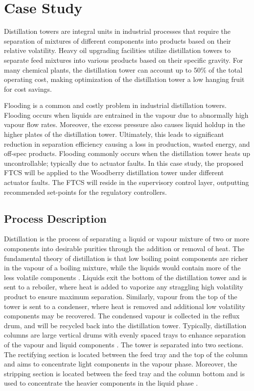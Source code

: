 \section{Case Study}
Distillation towers are integral units in industrial processes that require the separation of
mixtures of different components into products based on their relative volatility. Heavy oil
upgrading facilities utilize distillation towers to separate feed mixtures into various products based on their specific gravity.  For many chemical plants, the distillation tower can account up to 50\% of the total operating cost, making optimization of the distillation tower a low hanging fruit for cost savings.  

Flooding is a common and costly problem in industrial distillation towers.  Flooding occurs when liquids are entrained in the vapour due to abnormally high vapour flow rates.  Moreover, the excess pressure also causes liquid holdup in the higher plates of the distillation tower. Ultimately, this leads to significant reduction in separation efficiency causing a loss in production, wasted energy, and off-spec products. Flooding commonly occurs when the distillation tower heats up uncontrollable; typically due to actuator faults.  In this case study, the proposed FTCS will be applied to the Woodberry distillation tower under different actuator faults. The FTCS will reside in the supervisory control layer, outputting recommended set-points for the regulatory controllers.

\subsection{Process Description}
Distillation is the process of separating a liquid or vapour mixture of two or more components into desirable purities through the addition or removal of heat. The fundamental theory of distillation is that low boiling point components are richer in the vapour of a boiling mixture, while the liquids would contain more of the less volatile components \cite{distillation_intro}.  Liquids exit the bottom of the distillation tower and is sent to a reboiler, where heat is added to vaporize any straggling high volatility product to ensure maximum separation. Similarly, vapour from the top of the tower is sent to a condenser, where heat is removed and additional low volatility components may be recovered. The condensed vapour is collected in the reflux drum, and will be recycled back into the distillation tower. Typically, distillation columns are large vertical drums with evenly spaced trays to enhance separation of the vapour and liquid components \cite{mpc_for_distillation_tower}.  The tower is separated into two sections.  The rectifying section is located between the feed tray and the top of the column and aims to concentrate light components in the vapour phase.  Moreover, the stripping section is located between the feed tray and the column bottom and is used to concentrate the heavier components in the liquid phase \cite{henry_distillation}.

